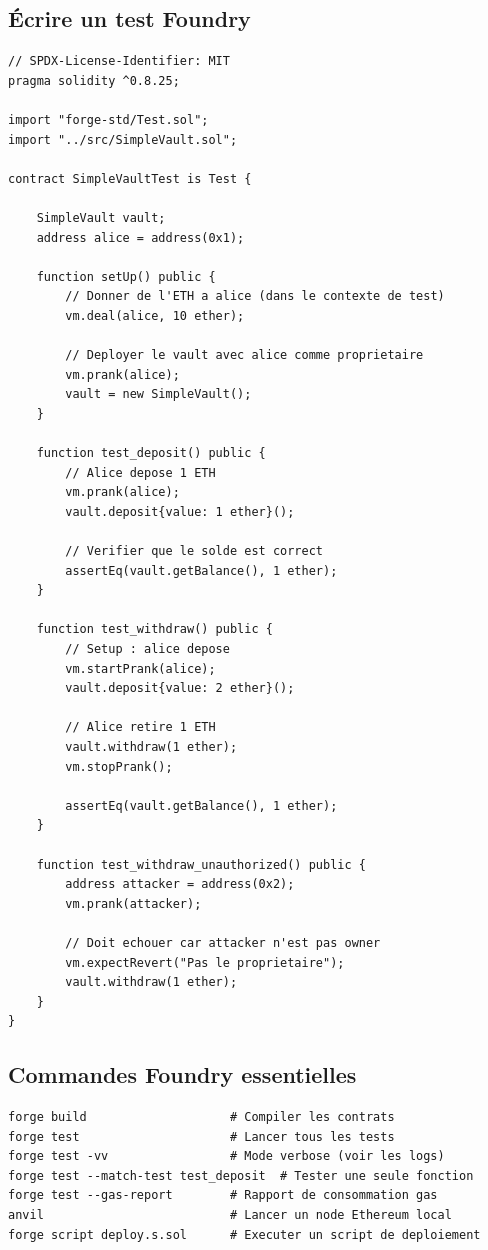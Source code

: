 \documentclass[12pt, a4paper]{article}
\begin{document}
\subsection{Écrire un test Foundry}

\begin{lstlisting}[style=solidity, caption={Test du SimpleVault}]
// SPDX-License-Identifier: MIT
pragma solidity ^0.8.25;

import "forge-std/Test.sol";
import "../src/SimpleVault.sol";

contract SimpleVaultTest is Test {

    SimpleVault vault;
    address alice = address(0x1);

    function setUp() public {
        // Donner de l'ETH a alice (dans le contexte de test)
        vm.deal(alice, 10 ether);

        // Deployer le vault avec alice comme proprietaire
        vm.prank(alice);
        vault = new SimpleVault();
    }

    function test_deposit() public {
        // Alice depose 1 ETH
        vm.prank(alice);
        vault.deposit{value: 1 ether}();

        // Verifier que le solde est correct
        assertEq(vault.getBalance(), 1 ether);
    }

    function test_withdraw() public {
        // Setup : alice depose
        vm.startPrank(alice);
        vault.deposit{value: 2 ether}();

        // Alice retire 1 ETH
        vault.withdraw(1 ether);
        vm.stopPrank();

        assertEq(vault.getBalance(), 1 ether);
    }

    function test_withdraw_unauthorized() public {
        address attacker = address(0x2);
        vm.prank(attacker);

        // Doit echouer car attacker n'est pas owner
        vm.expectRevert("Pas le proprietaire");
        vault.withdraw(1 ether);
    }
}
\end{lstlisting}

\subsection{Commandes Foundry essentielles}

\begin{lstlisting}[style=bash]
forge build                    # Compiler les contrats
forge test                     # Lancer tous les tests
forge test -vv                 # Mode verbose (voir les logs)
forge test --match-test test_deposit  # Tester une seule fonction
forge test --gas-report        # Rapport de consommation gas
anvil                          # Lancer un node Ethereum local
forge script deploy.s.sol      # Executer un script de deploiement
\end{lstlisting}
\end{document}
